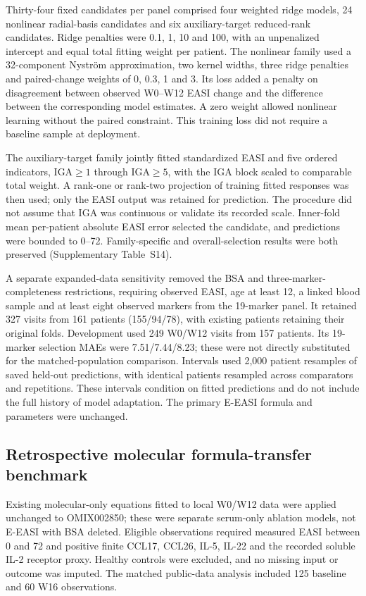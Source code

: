 \documentclass[10pt,a4paper]{article}
\begin{document}
Thirty-four fixed candidates per panel comprised four weighted ridge models, 24 nonlinear radial-basis candidates and six auxiliary-target reduced-rank candidates. Ridge penalties were 0.1, 1, 10 and 100, with an unpenalized intercept and equal total fitting weight per patient. The nonlinear family used a 32-component Nystr\"om approximation, two kernel widths, three ridge penalties and paired-change weights of 0, 0.3, 1 and 3. Its loss added a penalty on disagreement between observed W0--W12 EASI change and the difference between the corresponding model estimates. A zero weight allowed nonlinear learning without the paired constraint. This training loss did not require a baseline sample at deployment.

The auxiliary-target family jointly fitted standardized EASI and five ordered indicators, IGA$\geq1$ through IGA$\geq5$, with the IGA block scaled to comparable total weight. A rank-one or rank-two projection of training fitted responses was then used; only the EASI output was retained for prediction. The procedure did not assume that IGA was continuous or validate its recorded scale. Inner-fold mean per-patient absolute EASI error selected the candidate, and predictions were bounded to 0--72. Family-specific and overall-selection results were both preserved (Supplementary Table~S14).

A separate expanded-data sensitivity removed the BSA and three-marker-completeness restrictions, requiring observed EASI, age at least 12, a linked blood sample and at least eight observed markers from the 19-marker panel. It retained 327 visits from 161 patients (155/94/78), with existing patients retaining their original folds. Development used 249 W0/W12 visits from 157 patients. Its 19-marker selection MAEs were 7.51/7.44/8.23; these were not directly substituted for the matched-population comparison. Intervals used 2,000 patient resamples of saved held-out predictions, with identical patients resampled across comparators and repetitions. These intervals condition on fitted predictions and do not include the full history of model adaptation. The primary E-EASI formula and parameters were unchanged.

\subsection*{Retrospective molecular formula-transfer benchmark}
Existing molecular-only equations fitted to local W0/W12 data were applied unchanged to OMIX002850; these were separate serum-only ablation models, not E-EASI with BSA deleted. Eligible observations required measured EASI between 0 and 72 and positive finite CCL17, CCL26, IL-5, IL-22 and the recorded soluble IL-2 receptor proxy. Healthy controls were excluded, and no missing input or outcome was imputed. The matched public-data analysis included 125 baseline and 60 W16 observations.\citep{wu2023}
\end{document}
